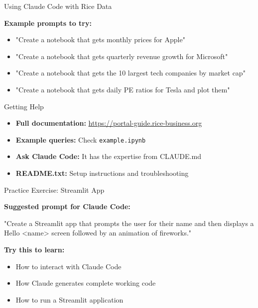 \documentclass[aspectratio=169]{beamer}
\begin{document}
\begin{frame}[fragile]{Using Claude Code with Rice Data}

\textbf{Example prompts to try:}

\begin{itemize}
    \item "Create a notebook that gets monthly prices for Apple"
    \item "Create a notebook that gets quarterly revenue growth for Microsoft"
    \item "Create a notebook that gets the 10 largest tech companies by market cap"
    \item "Create a notebook that gets daily PE ratios for Tesla and plot them"
\end{itemize}

\end{frame}



\begin{frame}{Getting Help}

\begin{itemize}
    \item \textbf{Full documentation:} \url{https://portal-guide.rice-business.org}
    \item \textbf{Example queries:} Check \texttt{example.ipynb}
    \item \textbf{Ask Claude Code:} It has the expertise from CLAUDE.md
    \item \textbf{README.txt:} Setup instructions and troubleshooting
\end{itemize}

\end{frame}

\begin{frame}{Practice Exercise: Streamlit App}

\textbf{Suggested prompt for Claude Code:}

\vspace{1em}

\small
"Create a Streamlit app that prompts the user for their name and then displays a Hello <name> screen followed by an animation of fireworks."

\vspace{1em}

\normalsize
\textbf{Try this to learn:}
\begin{itemize}
    \item How to interact with Claude Code
    \item How Claude generates complete working code
    \item How to run a Streamlit application
\end{itemize}

\end{frame}
\end{document}
